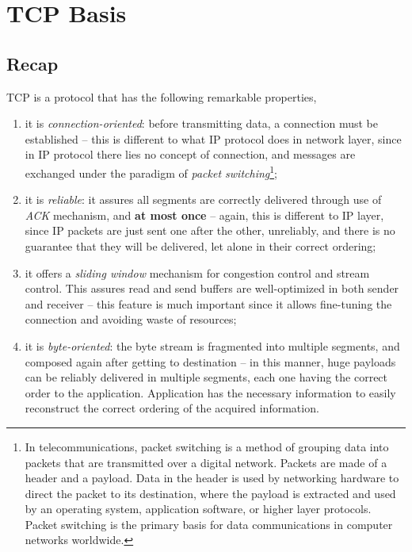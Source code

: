 \documentclass[10pt]{extreport}
\begin{document}
\section{TCP Basis}

\subsection{Recap}

TCP is a protocol that has the following remarkable properties,

\begin{enumerate}
	\item it is \emph{connection-oriented}: before transmitting data, a
		connection must be established \--- this is different to what
		IP protocol does in network layer, since in IP protocol there
        lies no concept of connection, and messages are exchanged under the
        paradigm of \emph{packet switching}\footnote{In telecommunications,
        packet switching is a method of grouping data into packets that are
    transmitted over a digital network. Packets are made of a header and a
payload. Data in the header is used by networking hardware to direct the packet
to its destination, where the payload is extracted and used by an operating
system, application software, or higher layer protocols. Packet switching is
the primary basis for data communications in computer networks worldwide. };
	\item it is \emph{reliable}: it assures all segments are correctly
		delivered through use of \emph{ACK} mechanism, and \textbf{at
		most once} \--- again, this is different to IP layer, since IP
        packets are just sent one after the other, unreliably, and there is no
        guarantee that they will be delivered, let alone in their correct
        ordering;
	\item it offers a \emph{sliding window} mechanism for congestion control
		and stream control. This assures read and send buffers are
		well-optimized in both sender and receiver \--- this feature is
		much important since it allows fine-tuning the connection and
		avoiding waste of resources;
	\item it is \emph{byte-oriented}: the byte stream is fragmented into
		multiple segments, and composed again after getting to
		destination \--- in this manner, huge payloads can be reliably
		delivered in multiple segments, each one having the correct
		order to the application. Application has the necessary information
		to easily reconstruct the correct ordering of the acquired 
		information.
\end{enumerate}
\end{document}
